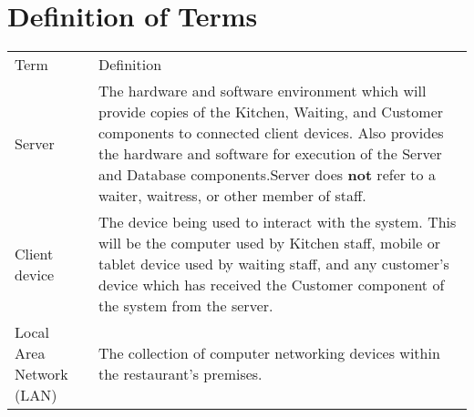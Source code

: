 \documentclass[11pt, a4paper]{report}
\begin{document}
\section{Definition of Terms} \label{subsec:Definitions}
\vspace{1cm}

\begin{tabulary}{1.2\textwidth}{l L}
Term & Definition \\

Server & The hardware and software environment which will provide copies of the Kitchen, Waiting, and Customer components to connected client devices. Also provides the hardware and software for execution of the Server and Database components.\newline Server does \textbf{not} refer to a waiter, waitress, or other member of staff. \\ \midrule
Client device & The device being used to interact with the system. This will be the computer used by Kitchen staff, mobile or tablet device used by waiting staff, and any customer's device which has received the Customer component of the system from the server.\\ \midrule
Local Area Network (LAN) & The collection of computer networking devices within the restaurant's premises.
\end{tabulary}
\end{document}
